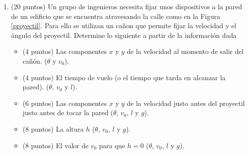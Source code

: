 \documentclass[letterpaper,10pt,onecolumn]{article}
\begin{document}
\begin{enumerate}
\begin{itemize}
\item (4 puntos) Encuentre la velocidad instant\'anea en funci\'on del tiempo. 
\item (4 puntos) Encuentre la aceleraci\'on instant\'anea en funci\'on
  del  tiempo. 
\item (4 puntos) ?`Para qu\'e valores del tiempo $t$ la posici\'on es
  perpendicular a la velocidad instant\'anea?
\item (4 puntos) ?`Para qu\'e valores del tiempo $t$ la posici\'on es
  perpendicular a la aceleraci\'on instant\'anea?
\item (4 puntos) Haga una gr\'afica de la trayectoria de la
  part\'icula en el plano $x-y$. Los ejes deben estar marcados con las
  unidades y magnitudes adecuadas.
\end{itemize}


\item (20 puntos) 
Un grupo de ingenieros necesita fijar unos dispositivos a la pared de
un edificio que se encuentra atravesando la calle como en la Figura
\ref{proyectil}. 
Para ello se utilizan un ca\~non que permite fijar la velocidad y
el  \'angulo del proyectil. Determine lo siguiente a partir de la informaci\'on dada
\begin{itemize}
\item (4 puntos) Las componentes $x$ y $y$ de la velocidad
  al momento de salir del ca\~n\'on. ($\theta$ y $v_0$).
\item (4 puntos) El tiempo de vuelo (o el tiempo que tarda en alcanzar
  la pared). ($\theta$, $v_0$ y $l$).
\item (6 puntos) Las componentes $x$ y $y$ de la velocidad justo antes
  del proyectil justo antes de tocar la pared ($\theta$, $v_0$, $l$ y $g$).
\item (8 puntos) La altura $h$ ($\theta$, $v_0$, $l$ y $g$).
\item (8 puntos) El valor de $v_0$ para que $h=0$ ($\theta$, $v_0$, $l$ y $g$).
\end{itemize}
\end{enumerate}
\end{document}
